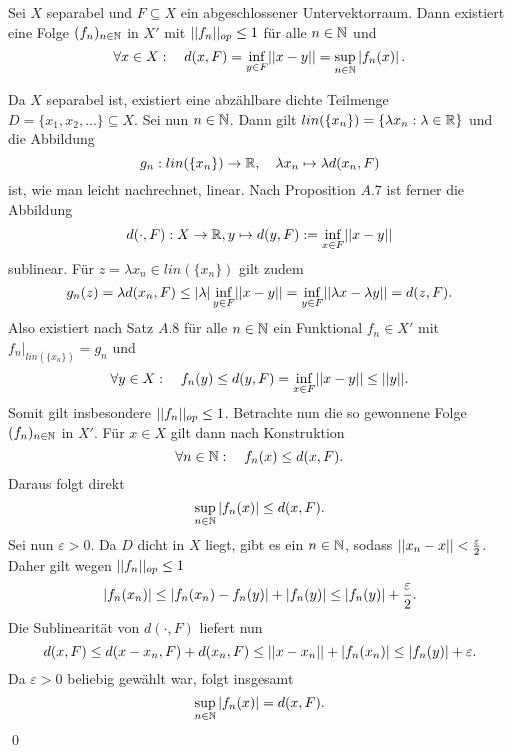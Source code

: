 \begin{corollary}
    Sei $X$ separabel und $F \subseteq X$ ein abgeschlossener Untervektorraum.
    Dann existiert eine Folge $(f_n)_{n \in \mathbb{N}}$ in $X'$ mit $\lvert\lvert f_n \rvert\rvert_{op} \leq 1$ für alle $n \in \mathbb{N}$ und 
    $$
        \forall x \in X: \quad d(x,F) = \inf_{y \in F}\lvert\lvert x-y \rvert\rvert = \sup_{n \in \mathbb{N}}\left| f_n(x) \right|. 
    $$
\end{corollary}
\begin{proof*}
    Da $X$ separabel ist, existiert eine abzählbare dichte Teilmenge $D = \{x_1,x_2,...\} \subseteq X$. Sei nun $n \in \mathbb{N}$. Dann gilt $lin(\{x_n\}) = \{\lambda x_n: \lambda \in \mathbb{R}\}$ und die Abbildung
    $$
        g_n: lin(\{x_n\}) \to \mathbb{R}, \quad \lambda x_n \mapsto \lambda d(x_n,F)
    $$
    ist, wie man leicht nachrechnet, linear. Nach Proposition $A.7$ ist ferner die Abbildung 
    $$
        d(\cdot, F):X \to \mathbb{R}, y \mapsto d(y,F) := \inf_{x \in F}\lvert\lvert x-y \rvert\rvert
    $$
    sublinear. Für $z = \lambda x_n \in lin(\{x_n\})$ gilt zudem 
    $$
        g_n(z) = \lambda d(x_n,F) \leq \left| \lambda \right| \inf_{y \in F}\lvert\lvert x-y \rvert\rvert = \inf_{y \in F}\lvert\lvert \lambda x - \lambda y \rvert\rvert = d(z,F). 
    $$
    Also existiert nach Satz $A.8$ für alle $n \in \mathbb{N}$ ein Funktional $f_n \in X'$ mit $f_n|_{lin(\{x_n\})} = g_n$ und 
    $$
        \forall y \in X: \quad f_n(y) \leq d(y,F) = \inf_{x \in F}\lvert\lvert x-y \rvert\rvert \leq \lvert\lvert y \rvert\rvert. 
    $$
    Somit gilt insbesondere $\lvert\lvert f_n \rvert\rvert_{op} \leq 1$. Betrachte nun die so gewonnene Folge $(f_n)_{n \in \mathbb{N}}$ in $X'$. Für $x \in X$ gilt dann nach Konstruktion
    $$
        \forall n \in \mathbb{N}: \quad f_n(x) \leq d(x,F). 
    $$
    Daraus folgt direkt
    $$
        \sup_{n \in \mathbb{N}}\left| f_n(x) \right| \leq d(x,F).
    $$
    Sei nun $\varepsilon > 0$. Da $D$ dicht in $X$ liegt, gibt es ein $n \in \mathbb{N}$, sodass $\lvert\lvert x_n - x \rvert\rvert < \frac{\varepsilon}{2}$. Daher gilt wegen $\lvert\lvert f_n \rvert\rvert_{op} \leq 1$
    $$
        \left| f_n(x_n) \right| \leq \left| f_n(x_n) - f_n(y) \right| + \left| f_n(y) \right| \leq \left| f_n(y) \right| + \frac{\varepsilon}{2}. 
    $$
    Die Sublinearität von $d(\cdot,F)$ liefert nun 
    $$
        d(x,F) \leq d(x-x_n,F) + d(x_n,F) \leq \lvert\lvert x-x_n \rvert\rvert + \left| f_n(x_n) \right| \leq \left| f_n(y) \right| + \varepsilon. 
    $$
    Da $\varepsilon > 0$ beliebig gewählt war, folgt insgesamt
    $$
        \sup_{n \in \mathbb{N}}\left| f_n(x) \right| = d(x,F).
    $$
    \qed
\end{proof*}
